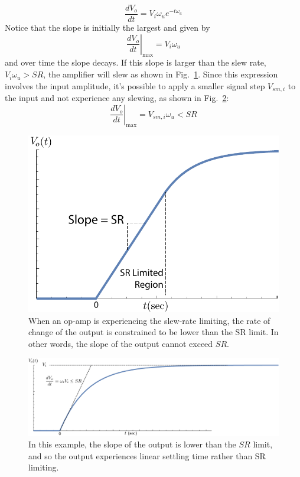     \begin{equation}
        \frac{dV_{o}}{dt} = V_i \omega_u e^{-t \omega_u}
    \end{equation}
Notice that the slope is initially the largest and given by
    \begin{equation}
        \left. \frac{dV_{o}}{dt} \right|_{\text{max}} = V_i \omega_u
    \end{equation}
and over time the slope decays. If this slope is larger than the slew rate, $V_i \omega_u > SR$, the amplifier will slew as shown in Fig.~\ref{fig:SR_case1}.  Since this expression involves the input amplitude, it's possible to apply a smaller signal step $V_{sm,i}$ to the input and not experience any slewing, as shown in Fig.~\ref{fig:SR_case2}:  
    \begin{equation}
        \left. \frac{dV_{o}}{dt} \right|_{\text{max}} = V_{sm,i} \omega_u  < SR
    \end{equation}
\begin{figure}[tb]
\centering
\includegraphics[width=.65\columnwidth]{SR_case1}
\caption{When an op-amp is experiencing the slew-rate limiting, the rate of change of the output is constrained to be lower than the SR limit.  In other words, the slope of the output cannot exceed $SR$.} \label{fig:SR_case1}
\end{figure} 
\begin{figure}[tb]
\centering
\includegraphics[width=.8\columnwidth]{SR_case2}
\caption{In this example, the slope of the output is lower than the $SR$ limit, and so the output experiences linear settling time rather than SR limiting.}
\label{fig:SR_case2}
\end{figure}
